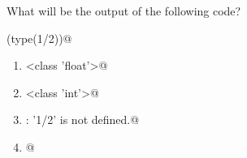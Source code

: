 \question
What will be the output of the following code?

\lstinline@print(type(1/2))@
\begin{enumerate}
\item \lstinline@<class 'float'>@
\item \lstinline@<class 'int'>@
\item \lstinline@NameError: '1/2' is not defined.@
\item {}@
\end{enumerate}

